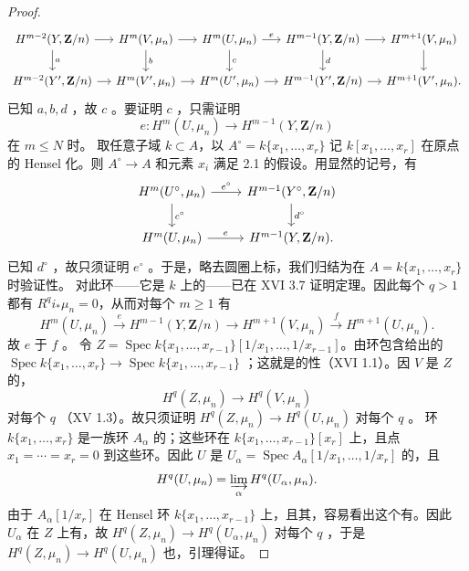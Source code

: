 \begin{proof}
\[\begin{tikzcd}[column sep=small]
H^{m-2}(Y,\mathbf Z/n)\arrow[r]\arrow[d,"a"]&H^m(V,\mu_n)\arrow[r]\arrow[d,"b"]&H^m(U,\mu_n)\arrow[r,"e"]\arrow[d,"c"]&H^{m-1}(Y,\mathbf Z/n)\arrow[r]\arrow[d,"d"]&H^{m+1}(V,\mu_n)\arrow[d]\\
H^{m-2}(Y',\mathbf Z/n)\arrow[r]&H^m(V',\mu_n)\arrow[r]&H^m(U',\mu_n)\arrow[r]&H^{m-1}(Y',\mathbf Z/n)\arrow[r]&H^{m+1}(V',\mu_n).
\end{tikzcd}\]
已知 $a,b,d$ ，故 $c$ 。要证明 $c$ ，只需证明
\[e:H^m(U,\mu_n)\longrightarrow H^{m-1}(Y,\mathbf Z/n)\]
在 $m\le N$ 时。
取任意子域 $k\subset A$，以 $A^\circ=k\{x_1,\ldots,x_r\}$ 记 $k[x_1,\ldots,x_r]$ 在原点的 Hensel 化。则 $A^\circ\to A$ 和元素 $x_i$ 满足 2.1 的假设。用显然的记号，有
\[\begin{tikzcd}H^m(U^\circ,\mu_n)\arrow[r,"e^\circ"]\arrow[d,"c^\circ"]&H^{m-1}(Y^\circ,\mathbf Z/n)\arrow[d,"d^\circ"]\\H^m(U,\mu_n)\arrow[r,"e"]&H^{m-1}(Y,\mathbf Z/n).
\end{tikzcd}\]
已知 $d^\circ$ ，故只须证明 $e^\circ$ 。于是，略去圆圈上标，我们归结为在 $A=k\{x_1,\ldots,x_r\}$ 时验证性。
对此环——它是 $k$ 上的——已在 XVI 3.7 证明定理。因此每个 $q>1$ 都有 $R^qi_*\mu_n=0$，从而对每个 $m\ge1$ 有
\[H^m(U,\mu_n)\xrightarrow e H^{m-1}(Y,\mathbf Z/n)\longrightarrow H^{m+1}(V,\mu_n)\xrightarrow f H^{m+1}(U,\mu_n).\]
故 $e$ 于 $f$ 。
令 $Z=\operatorname{Spec}k\{x_1,\ldots,x_{r-1}\}[1/x_1,\ldots,1/x_{r-1}]$。由环包含给出的
$\operatorname{Spec}k\{x_1,\ldots,x_r\}\to\operatorname{Spec}k\{x_1,\ldots,x_{r-1}\}$ ；这就是的性（XVI 1.1）。因 $V$ 是 $Z$ 的，
\[H^q(Z,\mu_n)\longrightarrow H^q(V,\mu_n)\]
对每个 $q$ （XV 1.3）。故只须证明 $H^q(Z,\mu_n)\to H^q(U,\mu_n)$ 对每个 $q$ 。
环 $k\{x_1,\ldots,x_r\}$ 是一族环 $A_\alpha$ 的；这些环在 $k\{x_1,\ldots,x_{r-1}\}[x_r]$ 上，且点 $x_1=\cdots=x_r=0$ 到这些环。因此 $U$ 是 $U_\alpha=\operatorname{Spec}A_\alpha[1/x_1,\ldots,1/x_r]$ 的，且
\[H^q(U,\mu_n)=\varinjlim_\alpha H^q(U_\alpha,\mu_n).\]
由于 $A_\alpha[1/x_r]$ 在 Hensel 环 $k\{x_1,\ldots,x_{r-1}\}$ 上，且其，容易看出这个有。因此 $U_\alpha$ 在 $Z$ 上有，故 $H^q(Z,\mu_n)\to H^q(U_\alpha,\mu_n)$ 对每个 $q$ ，于是 $H^q(Z,\mu_n)\to H^q(U,\mu_n)$ 也，引理得证。
\end{proof}
